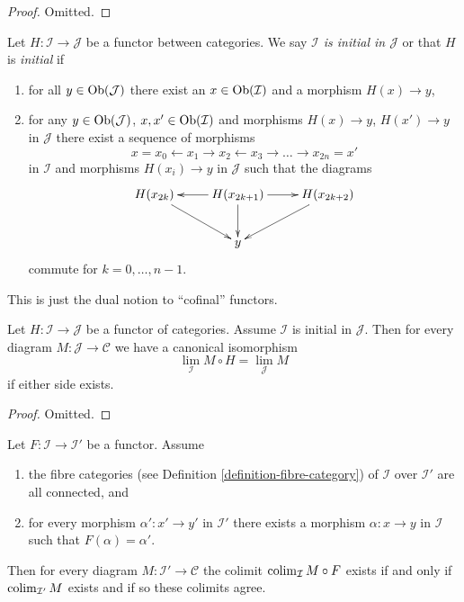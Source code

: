 \begin{proof}
Omitted.
\end{proof}

\begin{definition}
\label{definition-initial}
Let $H : \mathcal{I} \to \mathcal{J}$ be a functor between categories.
We say {\it $\mathcal{I}$ is initial in $\mathcal{J}$} or that
$H$ is {\it initial} if
\begin{enumerate}
\item for all $y \in \mathop{\mathrm{Ob}}\nolimits(\mathcal{J})$ there exist an
$x \in \mathop{\mathrm{Ob}}\nolimits(\mathcal{I})$ and a morphism $H(x) \to y$,
\item for any $y \in \mathop{\mathrm{Ob}}\nolimits(\mathcal{J})$, $x , x' \in \mathop{\mathrm{Ob}}\nolimits(\mathcal{I})$ and
morphisms $H(x) \to y$, $H(x') \to y$ in $\mathcal{J}$
there exist a sequence of morphisms
$$
x = x_0 \leftarrow x_1 \rightarrow x_2 \leftarrow x_3 \rightarrow \ldots
\rightarrow x_{2n} = x'
$$
in $\mathcal{I}$ and morphisms $H(x_i) \to y$ in $\mathcal{J}$
such that the diagrams
$$
\xymatrix{
H(x_{2k}) \ar[rd] &
H(x_{2k + 1}) \ar[l] \ar[r] \ar[d] &
H(x_{2k + 2}) \ar[ld] \\
& y
}
$$
commute for $k = 0, \ldots, n - 1$.
\end{enumerate}
\end{definition}

\noindent
This is just the dual notion to ``cofinal'' functors.

\begin{lemma}
\label{lemma-initial}
Let $H : \mathcal{I} \to \mathcal{J}$ be a functor of categories.
Assume $\mathcal{I}$ is initial in $\mathcal{J}$.
Then for every diagram $M : \mathcal{J} \to \mathcal{C}$ we
have a canonical isomorphism
$$
\lim_\mathcal{I} M \circ H = \lim_\mathcal{J} M
$$
if either side exists.
\end{lemma}

\begin{proof}
Omitted.
\end{proof}

\begin{lemma}
\label{lemma-colimit-constant-connected-fibers}
Let $F : \mathcal{I} \to \mathcal{I}'$ be a functor.
Assume
\begin{enumerate}
\item the fibre categories (see
Definition \ref{definition-fibre-category})
of $\mathcal{I}$ over $\mathcal{I}'$ are all connected, and
\item for every morphism $\alpha' : x' \to y'$ in $\mathcal{I}'$ there
exists a morphism $\alpha : x \to y$ in $\mathcal{I}$ such that
$F(\alpha) = \alpha'$.
\end{enumerate}
Then for every diagram $M : \mathcal{I}' \to \mathcal{C}$
the colimit $\mathop{\mathrm{colim}}\nolimits_\mathcal{I} M \circ F$ exists if and only
if $\mathop{\mathrm{colim}}\nolimits_{\mathcal{I}'} M$ exists and if so these colimits
agree.
\end{lemma}

